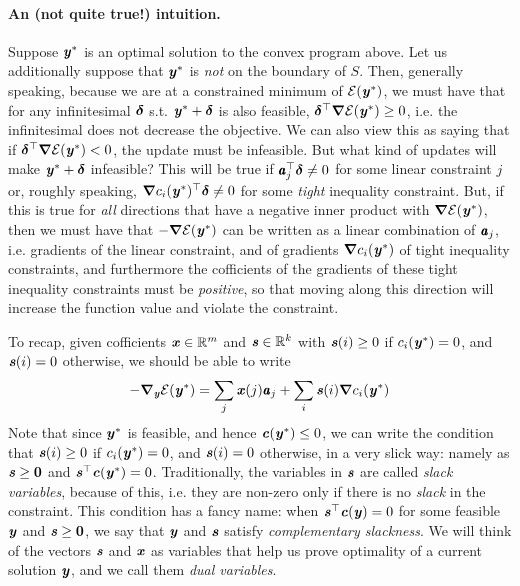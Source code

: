 \paragraph{An (not quite true!) intuition.}
Suppose $\yy^*$ is an optimal solution to the convex program above.
Let us additionally suppose that $\yy^*$ is \emph{not} on the boundary
of $S$.
Then, generally speaking, because we are at a constrained minimum of
$\energy(\yy^*)$, we must have that for any infinitesimal $\ddelta$
s.t. $\yy^*+\ddelta$ is also feasible, $\ddelta^{\top} \grad
\energy(\yy^*) \geq 0$, i.e. the infinitesimal does not decrease the
objective.
We can also view this as saying that if $\ddelta^{\top} \grad
\energy(\yy^*)  < 0$, the update must be infeasible.
But what kind of updates will make $\yy^*+\ddelta$ infeasible?
This will be true if $\aa_j^{\top} \ddelta \neq 0$ for some linear
constraint $j$ or, roughly speaking, $\grad c_i(\yy^*)^{\top} \ddelta \neq 0$ for some
\emph{tight} inequality constraint.
But, if this is true for \emph{all} directions that have a negative
inner product with $\grad \energy(\yy^*)$, then we must have that
$-\grad \energy(\yy^*)$ can be written as a linear combination of
$\aa_j$, i.e. gradients of the linear constraint, and of
gradients $\grad c_i(\yy^*)$ of tight inequality constraints,
and furthermore the cofficients of the gradients of these tight
inequality constraints must be \emph{positive}, so that moving along
this direction will increase the function value and violate the constraint. 

To recap, given cofficients $\xx \in \R^m$ and $\ss \in \R^k$ with
$\ss(i) \geq 0$ if $c_i(\yy^*) = 0$, and $\ss(i) = 0$ otherwise, we
should be able to write
\begin{align}
  -\grad_{\yy}\calE(\yy^*) = \sum_{j} \xx(j) \aa_j + \sum_{i}
  \ss(i)\grad c_i(\yy^*)
  \label{eq:compSlackIntro}
\end{align}
  Note that since $\yy^*$ is feasible, and hence $\cc(\yy^*) \leq 0$,
  we can write the condition that
$\ss(i) \geq 0$ if $c_i(\yy^*) = 0$, and $\ss(i) = 0$ otherwise, in a
very slick way: namely as $\ss \geq \veczero$ and $\ss^{\top}
\cc(\yy^*) = 0$.
Traditionally, the variables in $\ss$ are called \emph{slack
  variables}, because of this, i.e. they are non-zero only if there is
no \emph{slack} in the constraint. 
This condition has a fancy name: when $\ss^{\top}
\cc(\yy) = 0$ for some feasible $\yy$ and $\ss \geq \veczero$, we say
that $\yy$ and $\ss$ satisfy \emph{complementary slackness}.
%
We will think of the vectors $\ss$ and $\xx$ as variables that help
us prove optimality of a current solution $\yy$, and we call them
\emph{dual variables}.

